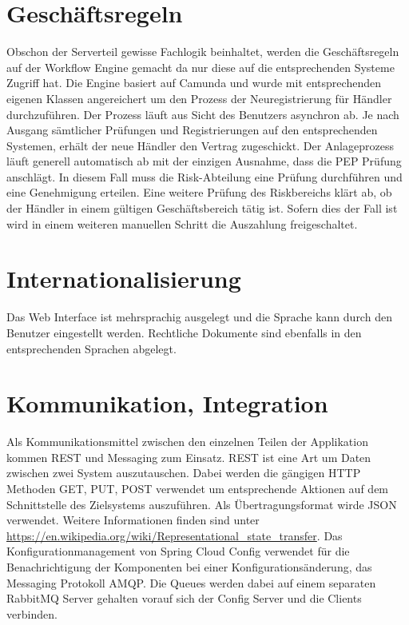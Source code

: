 \section{Geschäftsregeln}

Obschon der Serverteil gewisse Fachlogik beinhaltet, werden die Geschäftsregeln auf der Workflow Engine gemacht da nur diese auf die entsprechenden Systeme Zugriff hat. Die Engine basiert auf Camunda und wurde mit entsprechenden eigenen Klassen angereichert um den Prozess der Neuregistrierung für Händler durchzuführen. Der Prozess läuft aus Sicht des Benutzers asynchron ab. Je nach Ausgang sämtlicher Prüfungen und Registrierungen auf den entsprechenden Systemen, erhält der neue Händler den Vertrag zugeschickt. Der Anlageprozess läuft generell automatisch ab mit der einzigen Ausnahme, dass die \gls{PEP} Prüfung anschlägt. In diesem Fall muss die Risk-Abteilung eine Prüfung durchführen und eine Genehmigung erteilen. Eine weitere Prüfung des Riskbereichs klärt ab, ob der Händler in einem gültigen Geschäftsbereich tätig ist. Sofern dies der Fall ist wird in einem weiteren manuellen Schritt die Auszahlung freigeschaltet.

\section{Internationalisierung}

Das Web Interface ist mehrsprachig ausgelegt und die Sprache kann durch den Benutzer eingestellt werden. Rechtliche Dokumente sind ebenfalls in den entsprechenden Sprachen abgelegt.

\section{Kommunikation, Integration}

Als Kommunikationsmittel zwischen den einzelnen Teilen der Applikation kommen \gls{REST} und Messaging zum Einsatz. REST ist eine Art um Daten zwischen zwei System auszutauschen. Dabei werden die gängigen HTTP Methoden GET, PUT, POST  verwendet um entsprechende Aktionen auf dem Schnittstelle des Zielsystems auszuführen. Als Übertragungsformat wirde JSON verwendet. Weitere Informationen finden sind unter \url{https://en.wikipedia.org/wiki/Representational_state_transfer}.\newline
Das Konfigurationmanagement von Spring Cloud Config verwendet für die Benachrichtigung der Komponenten bei einer Konfigurationsänderung, das Messaging Protokoll \Gls{AMQP}. Die Queues werden dabei auf einem separaten RabbitMQ Server gehalten vorauf sich der Config Server und die Clients verbinden.

